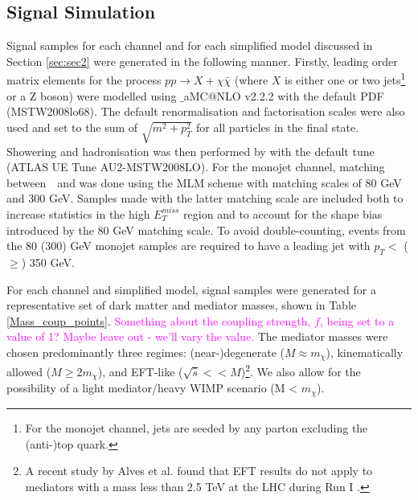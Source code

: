 \subsection{Signal Simulation}
\label{signal_generation}
\begin{flushleft}
Signal samples for each channel and for each simplified model discussed in Section \ref{sec:sec2} were generated in the following manner. Firstly, leading order matrix elements for the process $pp \rightarrow X + \chi\bar{\chi}$ (where $X$ is either one or two jets\footnote{For the monojet channel, jets are seeded by any parton excluding the (anti-)top quark.} or a Z boson) were modelled using \MG$\_$aMC$@$NLO v2.2.2 with the default PDF (MSTW2008lo68). The default renormalisation and factorisation scales were also used and set to the sum of $\sqrt{m^{2} + p_{T}^{2}}$ for all particles in the final state. Showering and hadronisation was then performed by  with the default tune (ATLAS UE Tune AU2-MSTW2008LO). For the monojet channel, matching between \MG$\mbox{ }$and \PYTHIA was done using the MLM scheme with matching scales of 80 GeV and 300 GeV. Samples made with the latter matching scale are included both to increase statistics in the high $E_{T}^{miss}$ region and to account for the shape bias introduced by the 80 GeV matching scale. To avoid double-counting, events from the 80 (300) GeV monojet samples are required to have a leading jet with $p_{T} <$ ($\geq$) 350 GeV.
\bigskip

For each channel and simplified model, signal samples were generated for a representative set of dark matter and mediator masses, shown in Table \ref{Mass_coup_points}. \textcolor{magenta}{Something about the coupling strength, $f$, being set to a value of 1? Maybe leave out - we'll vary the value.} The mediator masses were chosen  predominantly three regimes: (near-)degenerate ($M\approx m_{\chi}$), kinematically allowed ($M \geq 2m_{\chi}$), and EFT-like ($\sqrt{\hat{s}} << M$)\footnote{A recent study by Alves et al. found that EFT results do not apply to mediators with a mass less than 2.5 TeV at the LHC during Run I \cite{Alves:2011wf}.}. We also allow for the possibility of a light mediator/heavy WIMP scenario (M < $m_{\chi}$).  


\end{flushleft}
